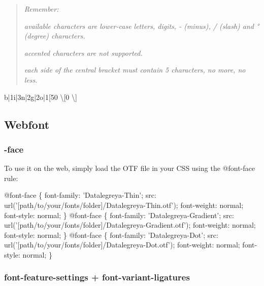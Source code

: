 \begin{quote}
{\itshape Remember\+:}


\begin{DoxyItemize}
\item {\itshape available characters are lower-\/case letters, digits, {\ttfamily -\/} (minus), {\ttfamily /} (slash) and {\ttfamily °} (degree) characters.}
\item {\itshape accented characters are not supported.}
\item {\itshape each side of the central bracket must contain 5 characters, no more, no less.} 
\end{DoxyItemize}\end{quote}



\begin{DoxyPre}{\ttfamily b|1i|3n|2g|2o|1[50   \textbackslash{}[0    \textbackslash{}]}\end{DoxyPre}




\subsection*{Webfont}

\subsubsection*{-\/face}

To use it on the web, simply load the O\+TF file in your C\+SS using the {\ttfamily @font-\/face} rule\+:


\begin{DoxyCode}
@font-face \{
    font-family: 'Datalegreya-Thin';
    src: url('[path/to/your/fonts/folder]/Datalegreya-Thin.otf');
    font-weight: normal;
    font-style: normal;
\}
@font-face \{
    font-family: 'Datalegreya-Gradient';
    src: url('[path/to/your/fonts/folder]/Datalegreya-Gradient.otf');
    font-weight: normal;
    font-style: normal;
\}
@font-face \{
    font-family: 'Datalegreya-Dot';
    src: url('[path/to/your/fonts/folder]/Datalegreya-Dot.otf');
    font-weight: normal;
    font-style: normal;
\}
\end{DoxyCode}


\subsubsection*{{\ttfamily font-\/feature-\/settings} + {\ttfamily font-\/variant-\/ligatures}}


